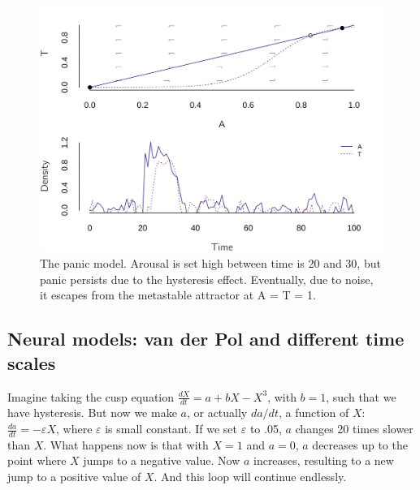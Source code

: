 \documentclass[
  a4paper,
  DIV=11,
  numbers=noendperiod,
  oneside]{scrreprt}
\begin{document}
\begin{figure}

{\centering \includegraphics{media/ch4n/fig-ch4n-img13-old-61.png}

}

\caption{\label{fig-ch4n-img13-old-61}The panic model. Arousal is set
high between time is 20 and 30, but panic persists due to the hysteresis
effect. Eventually, due to noise, it escapes from the metastable
attractor at A = T = 1.}

\end{figure}

\hypertarget{sec-Neural-models-van-der-Pol-and-different-time-scales}{%
\subsection{Neural models: van der Pol and different time
scales}\label{sec-Neural-models-van-der-Pol-and-different-time-scales}}

Imagine taking the cusp equation \(\frac{dX}{dt} = {a + bX - X}^{3}\),
with \(b=1\), such that we have hysteresis. But now we make \(a\), or
actually \(da/dt\), a function of \(X\):
\(\frac{da}{dt} = - \varepsilon X\), where \(\varepsilon\) is small
constant. If we set \(\varepsilon\) to .05, \(a\) changes 20 times
slower than \(X\). What happens now is that with \(X = 1\) and
\(a = 0\), \(a\) decreases up to the point where \(X\) jumps to a
negative value. Now \(a\) increases, resulting to a new jump to a
positive value of \(X\). And this loop will continue endlessly.
\end{document}
